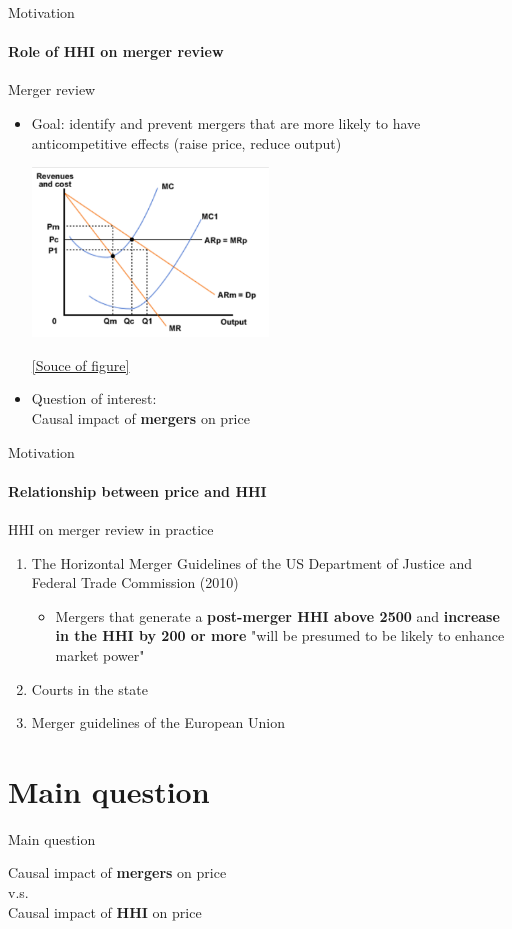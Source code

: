 \documentclass{beamer}
\begin{document}
\begin{frame}{Motivation}
\framesubtitle{Role of HHI on merger review}
Merger review
\begin{itemize}
\item Goal: identify and prevent  mergers that are more likely to have anticompetitive effects (raise price, reduce output)
\begin{center}
\includegraphics[height=4.5cm]{pic188}
\end{center}
 \begin{flushright}
\href{http://www.sanandres.esc.edu.ar/secondary/economics\%20packs/microeconomics/page_121.htm}{[Souce of figure]}
\end{flushright} 
\item Question of interest: \\
Causal impact of \textbf{mergers} on price
\end{itemize}
\end{frame}

\begin{frame}{Motivation}
\framesubtitle{Relationship between price and HHI}
HHI on merger review in practice
\begin{enumerate}
\item The Horizontal Merger Guidelines of the US Department of Justice and Federal Trade Commission (2010)\\
	\begin{itemize}
	\item Mergers that generate a \textbf{post-merger HHI above 2500} and \textbf{increase in the HHI by 200 or more} "will be presumed to be likely to enhance market power"
	\end{itemize}
\item Courts in the state
\item Merger guidelines of the European Union
\end{enumerate}
\hfill \break
\end{frame}

\section{Main question}
\begin{frame}{Main question}
\begin{center}
Causal impact of \textbf{mergers} on price\\ 
v.s.\\
 Causal impact of \textbf{HHI} on price
\end{center}
\end{frame}
\end{document}
